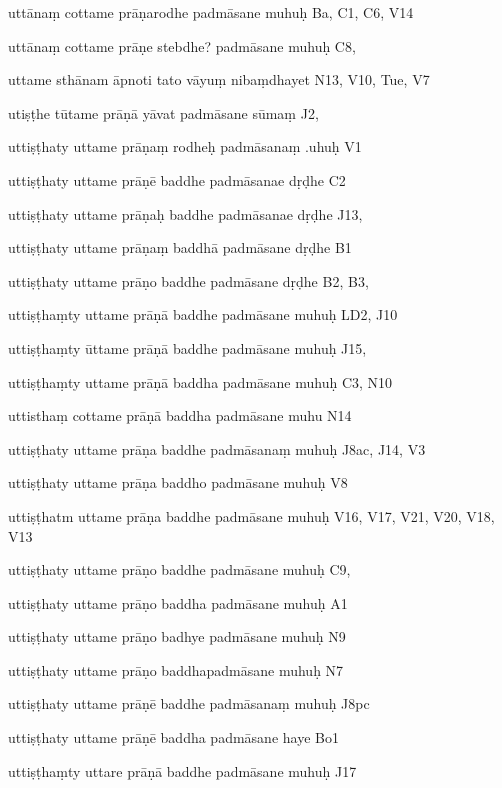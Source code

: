 \begin{ekdosis}
\begin{marma}[hp01_055]
\begin{marma}[hp02_009]
\begin{marma}[hp02_011]
        \begin{marma}[hp02_012]
        \item[uttānaṃ cottame prāṇarodhe padmāsane muhuḥ] Ba, C1, C6, V14
        \item[uttānaṃ cottame prāṇe stebdhe? padmāsane muhuḥ] C8,
        \item[uttame sthānam āpnoti tato vāyuṃ nibaṃdhayet] N13, V10, Tue, V7
        \item[utiṣṭhe tūtame prāṇā yāvat padmāsane sūmaṃ] J2,
        \item[uttiṣṭhaty uttame prāṇaṃ rodheḥ padmāsanaṃ .uhuḥ] V1
        \item[uttiṣṭhaty uttame prāṇē baddhe padmāsanae dṛḍhe] C2
        \item[uttiṣṭhaty uttame prāṇaḥ baddhe padmāsanae dṛḍhe] J13,
        \item[uttiṣṭhaty uttame prāṇaṃ baddhā padmāsane dṛḍhe] B1
        \item[uttiṣṭhaty uttame prāṇo baddhe padmāsane dṛḍhe] B2, B3,
        \item[uttiṣṭhaṃty uttame prāṇā baddhe padmāsane muhuḥ] LD2, J10
        \item[uttiṣṭhaṃty ūttame prāṇā baddhe padmāsane muhuḥ] J15,
        \item[uttiṣṭhaṃty uttame prāṇā baddha padmāsane muhuḥ] C3, N10
        \item[uttisthaṃ cottame prāṇā baddha padmāsane muhu] N14
        \item[uttiṣṭhaty uttame prāṇa baddhe padmāsanaṃ muhuḥ] J8ac, J14, V3
        \item[uttiṣṭhaty uttame prāṇa baddho padmāsane muhuḥ] V8
        \item[uttiṣṭhatm uttame prāṇa baddhe padmāsane muhuḥ] V16, V17, V21, V20, V18, V13
        \item[uttiṣṭhaty uttame prāṇo baddhe padmāsane muhuḥ] C9, 
        \item[uttiṣṭhaty uttame prāṇo baddha padmāsane muhuḥ] A1
        \item[uttiṣṭhaty uttame prāṇo badhye padmāsane muhuḥ] N9
        \item[uttiṣṭhaty uttame prāṇo baddhapadmāsane muhuḥ] N7
        \item[uttiṣṭhaty uttame prāṇē baddhe padmāsanaṃ muhuḥ] J8pc
        \item[uttiṣṭhaty uttame prāṇē baddha padmāsane haye] Bo1
        \item[uttiṣṭhaṃty uttare prāṇā baddhe padmāsane muhuḥ] J17

\end{marma}
\end{marma}
\end{marma}
\end{marma}
\end{ekdosis}
